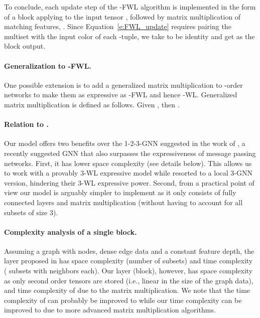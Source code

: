 \documentclass{article}
\newcommand{\revision}[1]{{\color{black} #1}}
\def\Eqref#1{Equation~\ref{#1}}
\begin{document}
To conclude, each update step of the -FWL algorithm is implemented in the form of a block  applying  to the input tensor , followed by matrix multiplication of matching features, . Since \Eqref{e:FWL_update} requires pairing the multiset with the input color of each -tuple, we take  to be identity and get  as the block output. 

\paragraph{Generalization to -FWL.} One possible extension is to add a generalized matrix multiplication to -order networks to make them as expressive as -FWL and hence -WL. Generalized matrix multiplication is defined as follows. Given , then .


\revision{\paragraph{Relation to \citep{morris2018weisfeiler}.} Our model offers two benefits over the 1-2-3-GNN suggested in the work of \cite{morris2018weisfeiler}, a recently suggested GNN that also surpasses the expressiveness of message passing networks. First, it has lower space complexity (see details below). This allows us to work with a provably 3-WL expressive model while \cite{morris2018weisfeiler} resorted to a local 3-GNN version, hindering their 3-WL expressive power. Second, from a practical point of view our model is arguably simpler to implement as it only consists of fully connected layers and matrix multiplication (without having to account for all subsets of size 3). }

\revision{ \paragraph{Complexity analysis of a single block.}  Assuming a graph with  nodes, dense edge data and a
constant feature depth, the layer proposed in \cite{morris2018weisfeiler} has  space complexity (number of subsets) and  time complexity ( subsets with  neighbors each). Our layer (block), however, has  space complexity as only second order tensors are stored (i.e., linear in the size of the graph data), and time complexity of  due to the matrix multiplication. We note that the time complexity of \cite{morris2018weisfeiler} can probably be improved to  while our time complexity can be improved to  due to more advanced matrix multiplication algorithms. }
\end{document}
